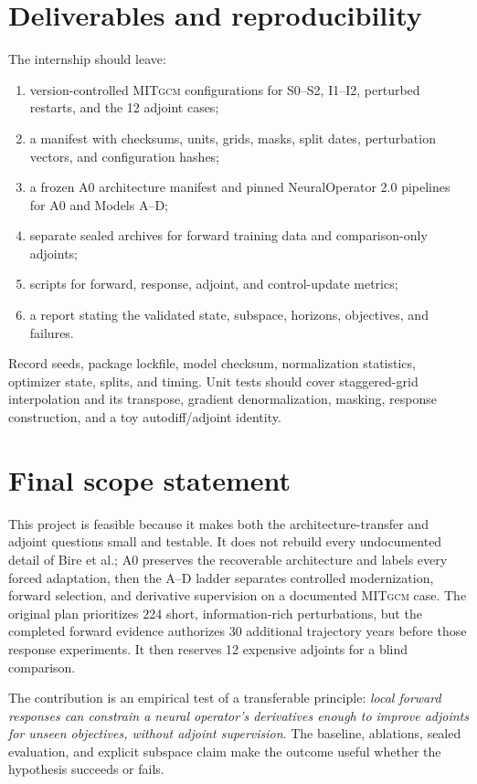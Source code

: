 \documentclass[11pt]{article}
\newcommand{\MITgcm}{\textsc{MITgcm}}
\begin{document}
\section{Deliverables and reproducibility}
The internship should leave:
\begin{enumerate}
\item version-controlled \MITgcm{} configurations for S0--S2, I1--I2, perturbed
restarts, and the 12 adjoint cases;
\item a manifest with checksums, units, grids, masks, split dates, perturbation vectors,
and configuration hashes;
\item a frozen A0 architecture manifest and pinned NeuralOperator 2.0 pipelines for A0
and Models A--D;
\item separate sealed archives for forward training data and comparison-only adjoints;
\item scripts for forward, response, adjoint, and control-update metrics;
\item a report stating the validated state, subspace, horizons, objectives, and failures.
\end{enumerate}

Record seeds, package lockfile, model checksum, normalization statistics, optimizer state,
splits, and timing. Unit tests should cover staggered-grid interpolation and its transpose,
gradient denormalization, masking, response construction, and a toy autodiff/adjoint
identity.

\section{Final scope statement}
This project is feasible because it makes both the architecture-transfer and adjoint
questions small and testable. It does not rebuild every undocumented detail of Bire
et al.; A0 preserves the recoverable architecture and labels every forced adaptation,
then the A--D ladder separates controlled modernization, forward selection, and
derivative supervision on a documented
\MITgcm{} case.  The original plan prioritizes 224 short, information-rich
perturbations, but the completed forward evidence authorizes 30 additional trajectory
years before those response experiments.  It then reserves 12 expensive adjoints for a
blind comparison.

The contribution is an empirical test of a transferable principle: \emph{local forward
responses can constrain a neural operator's derivatives enough to improve adjoints for
unseen objectives, without adjoint supervision}. The baseline, ablations, sealed
evaluation, and explicit subspace claim make the outcome useful whether the hypothesis
succeeds or fails.
\end{document}
